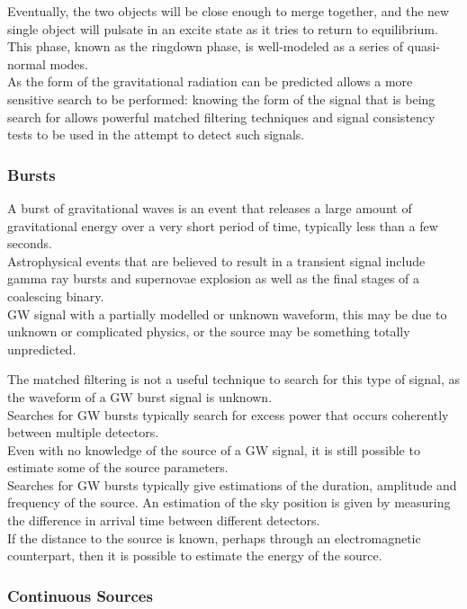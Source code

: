 \documentclass[binding=0.6cm, LaM]{sapthesis}
\begin{document}
	Eventually, the two objects will be close enough to merge together, 
	and the new single object will pulsate in an excite state as it tries to return to equilibrium. 
	This phase, known as the ringdown phase, is well-modeled as a series of quasi-normal modes. \\ 
	As the form of the gravitational radiation can be predicted allows 
	a more sensitive search to be performed: knowing the form of the signal 
	that is being search for allows powerful matched filtering techniques 
	and signal consistency tests to be used in the attempt to detect such signals.


\subsubsection{Bursts}

	A burst of gravitational waves is an event that releases a large amount 
	of gravitational energy over a very short period of time, typically less than a few seconds. \\ 
	Astrophysical events that are believed to result in a transient signal 
	include gamma ray bursts and supernovae explosion as well as the final stages of a coalescing binary. \\
	GW signal with a partially modelled or unknown waveform, 
	this may be due to unknown or complicated physics, or the source may be something totally unpredicted. 

	The matched filtering is not a useful technique to search for this type of signal, 
	as the waveform of a GW burst signal is unknown. \\
	Searches for GW bursts typically search for excess power that occurs coherently between multiple detectors. \\ 
	Even with no knowledge of the source of a GW signal, 
	it is still possible to estimate some of the source parameters. \\
	Searches for GW bursts typically give estimations of the duration, 
	amplitude and frequency of the source. 
	An estimation of the sky position is given by measuring the difference 
	in arrival time between different detectors. \\
	If the distance to the source is known, 
	perhaps through an electromagnetic counterpart, 
	then it is possible to estimate the energy of the source. 


\subsubsection{Continuous Sources}
\end{document}
